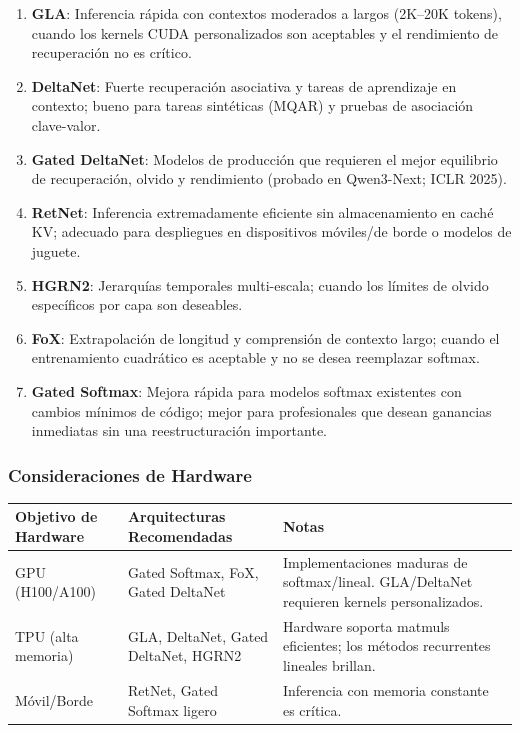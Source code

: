 \documentclass[11pt,a4paper]{article}
\begin{document}
\begin{enumerate}[leftmargin=*]
    \item \textbf{GLA}: Inferencia rápida con contextos moderados a largos (2K--20K tokens), cuando los kernels CUDA personalizados son aceptables y el rendimiento de recuperación no es crítico.
    \item \textbf{DeltaNet}: Fuerte recuperación asociativa y tareas de aprendizaje en contexto; bueno para tareas sintéticas (MQAR) y pruebas de asociación clave-valor.
    \item \textbf{Gated DeltaNet}: Modelos de producción que requieren el mejor equilibrio de recuperación, olvido y rendimiento (probado en Qwen3-Next; ICLR 2025).
    \item \textbf{RetNet}: Inferencia extremadamente eficiente sin almacenamiento en caché KV; adecuado para despliegues en dispositivos móviles/de borde o modelos de juguete.
    \item \textbf{HGRN2}: Jerarquías temporales multi-escala; cuando los límites de olvido específicos por capa son deseables.
    \item \textbf{FoX}: Extrapolación de longitud y comprensión de contexto largo; cuando el entrenamiento cuadrático es aceptable y no se desea reemplazar softmax.
    \item \textbf{Gated Softmax}: Mejora rápida para modelos softmax existentes con cambios mínimos de código; mejor para profesionales que desean ganancias inmediatas sin una reestructuración importante.
\end{enumerate}

\subsubsection{Consideraciones de Hardware}

\begin{table}[H]
\centering
\small
\begin{tabularx}{0.95\linewidth}{Xp{3.5cm}p{3.5cm}}
\toprule
\textbf{Objetivo de Hardware} & \textbf{Arquitecturas Recomendadas} & \textbf{Notas} \\
\midrule
GPU (H100/A100) & Gated Softmax, FoX, Gated DeltaNet & Implementaciones maduras de softmax/lineal. GLA/DeltaNet requieren kernels personalizados. \\
TPU (alta memoria) & GLA, DeltaNet, Gated DeltaNet, HGRN2 & Hardware soporta matmuls eficientes; los métodos recurrentes lineales brillan. \\
Móvil/Borde & RetNet, Gated Softmax ligero & Inferencia con memoria constante es crítica. \\
\bottomrule
\end{tabularx}
\end{table}
\end{document}

